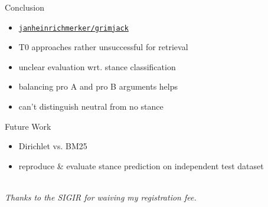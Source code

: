 \documentclass[english]{mlutalk}
\begin{document}
\begin{frame}{Conclusion}
  \begin{itemize}
    \setlength{\itemsep}{2ex}
    \item[\faIcon{github}] \href{https://github.com/janheinrichmerker/grimjack}{\texttt{janheinrichmerker/grimjack}}
    \item T0 approaches rather unsuccessful for retrieval
    \item unclear evaluation wrt. stance classification
    \item balancing pro A and pro B arguments helps
    \item can't distinguish neutral from no stance
  \end{itemize}
  \vspace{2ex}
  \begin{block}{Future Work}
    \begin{itemize}
      \setlength{\itemsep}{2ex}
      \item Dirichlet vs. BM25
      \item reproduce \& evaluate stance prediction on independent test dataset
    \end{itemize}
  \end{block}
  \begin{flushright}
    \thankyou \\
    {\itshape\scriptsize Thanks to the SIGIR for waiving my registration fee.}
  \end{flushright}
\end{frame}

\appendix
\section{\appendixname}

\bibliographyframe
\end{document}
